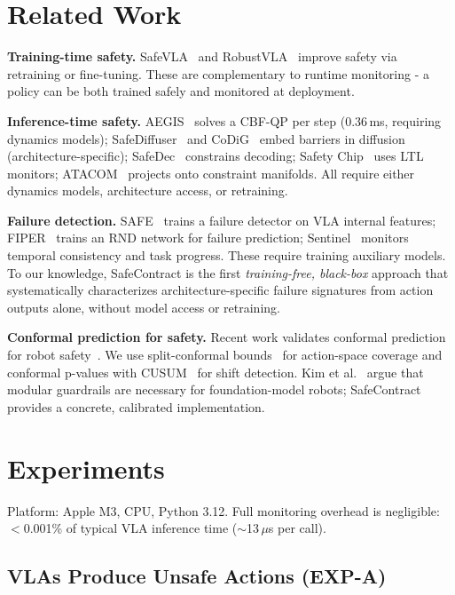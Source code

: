 \documentclass[conference]{IEEEtran}
\begin{document}
\section{Related Work}

\textbf{Training-time safety.}
SafeVLA~\cite{safevla} and RobustVLA~\cite{robustvla} improve safety via retraining or fine-tuning.
These are complementary to runtime monitoring - a policy can be both trained safely and monitored at deployment.

\textbf{Inference-time safety.}
AEGIS~\cite{aegis} solves a CBF-QP per step (0.36\,ms, requiring dynamics models); SafeDiffuser~\cite{safediffuser} and CoDiG~\cite{codig} embed barriers in diffusion (architecture-specific); SafeDec~\cite{safedec} constrains decoding; Safety Chip~\cite{safetychip} uses LTL monitors; ATACOM~\cite{atacom} projects onto constraint manifolds.
All require either dynamics models, architecture access, or retraining.

\textbf{Failure detection.}
SAFE~\cite{safe2025} trains a failure detector on VLA internal features; FIPER~\cite{fiper2025} trains an RND network for failure prediction; Sentinel~\cite{sentinel} monitors temporal consistency and task progress.
These require training auxiliary models.
To our knowledge, SafeContract is the first \emph{training-free, black-box} approach that systematically characterizes architecture-specific failure signatures from action outputs alone, without model access or retraining.

\textbf{Conformal prediction for safety.}
Recent work validates conformal prediction for robot safety~\cite{safe2025,feldman2025}.
We use split-conformal bounds~\cite{vovk2005} for action-space coverage and conformal p-values with CUSUM~\cite{page1954} for shift detection.
Kim et al.~\cite{kim2026guardrails} argue that modular guardrails are necessary for foundation-model robots; SafeContract provides a concrete, calibrated implementation.

\section{Experiments}

Platform: Apple M3, CPU, Python 3.12. Full monitoring overhead is negligible: $<$0.001\% of typical VLA inference time (${\sim}$13\,$\mu$s per call).

\subsection{VLAs Produce Unsafe Actions (EXP-A)}
\label{sec:exp_a}
\end{document}
